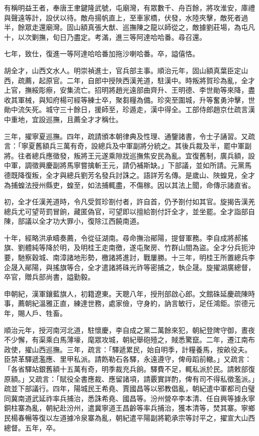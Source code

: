 \begin{pinyinscope}
有稱明益王者，奉唐王聿鍵隆武號，屯廟灣，有眾數千、舟百餘，將攻淮安，庫禮與聲遠等計，設伏以待。敵舟揚帆直上，至車家橋，伏發，水陸夾擊，敵死者過半，餘眾走還廟灣。固山額真張大猷、巡撫陳之龍以師從之，敵據劉莊場，為屯凡十，以次剿撫，旬日乃盡定。考滿，進三等阿達哈哈番。尋召還。

七年，致仕，復進一等阿達哈哈番加拖沙喇哈番。卒，謚僖恪。

胡全才，山西文水人。明崇禎進士，官兵部主事。順治元年，固山額真葉臣定山西，疏薦，起原官。二年，自郎中授陜西漢羌道，駐漢中。時叛將賀珍為亂，全才上官，撫綏彫瘵，安集流亡。招明將趙光遠部曲齊升、王明德、李世勛等來降，盡收其軍械，與知府楊可經等練士卒，聚芻糧為備。珍突至圍城，升等奮勇沖擊，世勛中流矢死。城守三十餘日，援師至，珍遁走，漢中得全。工部侍郎趙京仕疏言漢中重地，宜設巡撫，且薦全才才稱仕。

三年，擢寧夏巡撫。四年，疏請頒本朝律典及性理、通鑒諸書，令士子誦習。又疏言：「寧夏舊額兵三萬有奇，設總兵及中軍副將分統之。其後兵裁及半，罷中軍副將。往者總兵應徵發，叛將王元遂乘隙戕巡撫焦安民為亂。宜復舊制，廣兵額，設中軍，調徵興慶副將馬寧嘗擒斬王元，請仍補斯缺。」下部議，並如所請。元黨馬德既降復叛，全才與總兵劉芳名發兵討誅之。語詳芳名傳。是歲山、陜蝗見，全才為捕蝗法授州縣吏，蝗至，如法捕輒盡，不傷稼。因以其法上聞，命傳示諸直省。

初，全才任漢羌道時，令凡受賀珍劄付者，許自首，仍予劄付如其官。旋揭告漢羌總兵尤可望苛罰冒餉，藏匿偽官，可望即以擅給劄付訐全才，並坐罷。全才詣部自陳，部議以全才功大罪小，復除江西饒南道。

十年，經略洪承疇奏薦，令從征湖南。尋命撫治鄖陽，提督軍務。李自成將郝搖旗、劉體純等降於明，及明桂王走南徼，遂屯聚房、竹群山間為盜。全才分兵扼沖要，馳察穀城、南漳諸地形勢，檄諸將進討，戰屢勝。十三年，明桂王所置總兵李企晟入鄖陽，與搖旗等合，全才遣諸將硃光祚等密捕之，執企晟。旋擢湖廣總督，卒官，贈兵部尚書，謚勤毅。

申朝紀，漢軍鑲藍旗人，初籍遼東。天聰八年，授刑部啟心郎。文館硃延慶疏陳時事，薦朝紀溫雅正直，練達世務，處家儉，守身約，訥言敏行，足任鴻鉅。崇德元年，賜人戶、牲畜。

順治元年，授河南河北道，駐懷慶，李自成之黨二萬餘來犯，朝紀登陴守御，晝夜不少懈，有渠乘白馬薄壕，麾眾攻城，朝紀舉砲殪之，賊悉驚竄。二年，遷江南布政使，擢山西巡撫。三年，疏言：「驛遞累民，始自明季，計糧養馬，按畝役夫。臣禁革驛遞濫應、里甲私派。請飭勒石各驛，永遠遵守，俾毋蹈前轍。」又疏言：「各省驛站銀舊額十五萬有奇，明季裁充兵餉。驛費不足，輒私派於民。請敕部復原額。」又疏言：「賦役全書應裁、應留諸項，請覈實詳酌，俾有司不得私徵濫派。」疏並下部議行。四年，陽城民王希堯、賈國昌等以邪教倡亂，朝紀遣中軍都司白璧同冀南道武延祚率兵捕治，悉誅希堯、國昌等。汾州營卒李本清、任自興等據永寧銅柱寨為亂，朝紀赴汾州，遣冀寧道王昌齡等率兵捕治，獲本清等，焚其寨。寧鄉民楊春暢等復以左道據冷泉寨為亂，朝紀遣平陽副將範承宗等討平之，擢宣大山西總督。五年，卒。


\end{pinyinscope}
